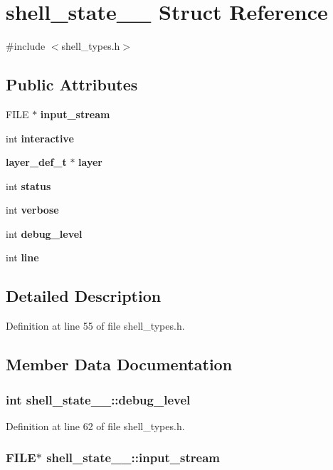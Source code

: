 \section{shell\_\-state\_\-\_\- Struct Reference}
\label{structshell__state____}


{\ttfamily \#include $<$shell\_\-types.h$>$}\subsection*{Public Attributes}
\begin{DoxyCompactItemize}
\item 
FILE $\ast$ {\bf input\_\-stream}
\item 
int {\bf interactive}
\item 
{\bf layer\_\-def\_\-t} $\ast$ {\bf layer}
\item 
int {\bf status}
\item 
int {\bf verbose}
\item 
int {\bf debug\_\-level}
\item 
int {\bf line}
\end{DoxyCompactItemize}


\subsection{Detailed Description}


Definition at line 55 of file shell\_\-types.h.

\subsection{Member Data Documentation}
\subsubsection[{debug\_\-level}]{\setlength{\rightskip}{0pt plus 5cm}int {\bf shell\_\-state\_\-\_\-::debug\_\-level}}\label{structshell__state_____a0dbfbd99cd492b36f310c006616a7fc9}


Definition at line 62 of file shell\_\-types.h.
\subsubsection[{input\_\-stream}]{\setlength{\rightskip}{0pt plus 5cm}FILE$\ast$ {\bf shell\_\-state\_\-\_\-::input\_\-stream}}\label{structshell__state_____ab9848d436ad635a7af41cf75e012f403}


